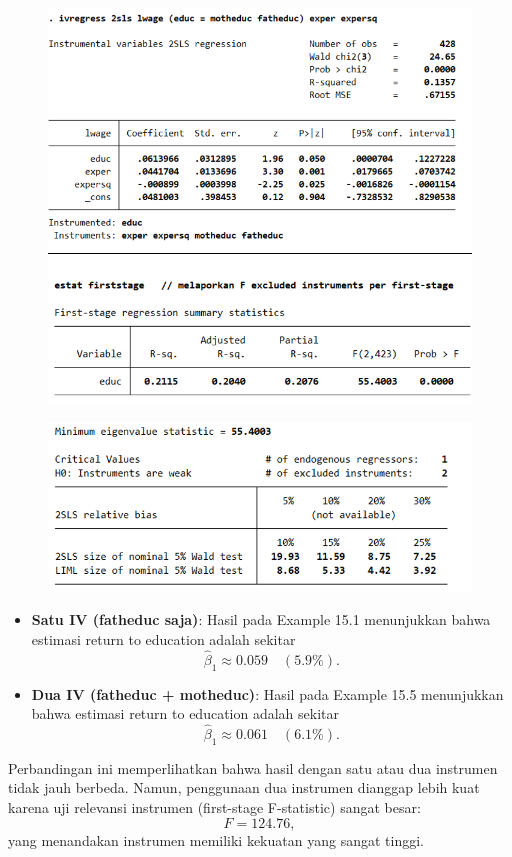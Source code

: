 \documentclass[]{article}
\begin{document}
\begin{figure}
    \centering
    \includegraphics[width=0.75\linewidth]{Satu.png}
 
    \label{fig:placeholder}
\end{figure}
\begin{figure}
    \centering
    \includegraphics[width=0.75\linewidth]{Dua.png}
 
    \label{fig:placeholder}
\end{figure}

\begin{itemize}
    \item \textbf{Satu IV (fatheduc saja)}: 
    Hasil pada Example 15.1 menunjukkan bahwa estimasi return to education adalah sekitar 
    \[
    \hat{\beta}_1 \approx 0.059 \quad (5.9\%).
    \]

    \item \textbf{Dua IV (fatheduc + motheduc)}: 
    Hasil pada Example 15.5 menunjukkan bahwa estimasi return to education adalah sekitar 
    \[
    \hat{\beta}_1 \approx 0.061 \quad (6.1\%).
    \]
\end{itemize}

\noindent
Perbandingan ini memperlihatkan bahwa hasil dengan satu atau dua instrumen tidak jauh berbeda. 
Namun, penggunaan dua instrumen dianggap lebih kuat karena uji relevansi instrumen (first-stage F-statistic) sangat besar:
\[
F = 124.76,
\]
yang menandakan instrumen memiliki kekuatan yang sangat tinggi.
\end{document}
